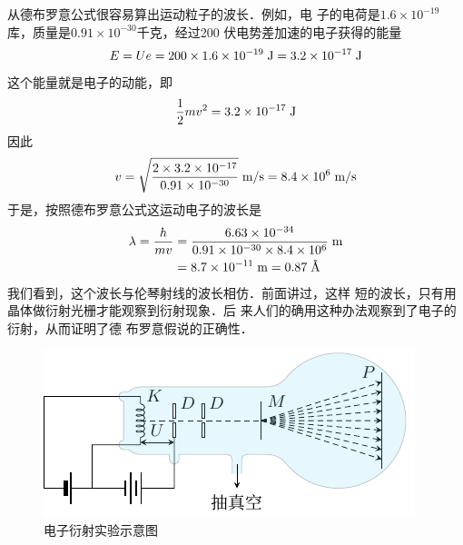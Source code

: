 从德布罗意公式很容易算出运动粒子的波长．例如，电
子的电荷是$1.6\times10^{-19}$
库，质量是$0.91\times10^{-30}$千克，经过200
伏电势差加速的电子获得的能量
\[E=Ue=200\times1.6\times10^{-19} \;\text{J} =3.2\times10^{-17} \;\text{J} \]
这个能量就是电子的动能，即
\[\dfrac{1}{2}mv^2=3.2\times10^{-17} \;\text{J} \]
因此
\[v=\sqrt{\frac{2\times 3.2\times10^{-17}}{0.91\times 10^{-30}}} \;\text{m}/\text{s} =8.4\times10^6\;\text{m}/\text{s} \]
于是，按照德布罗意公式这运动电子的波长是
\[\begin{split}
    \lambda=\dfrac{h}{mv}&=\frac{6.63\times 10^{-34}}{0.91\times10^{-30}\times8.4\times 10^6} \;\text{m}  \\
&=8.7\times10^{-11} \;\text{m} =0.87 \;\text{\AA}
\end{split}\]
我们看到，这个波长与伦琴射线的波长相仿．前面讲过，这样
短的波长，只有用晶体做衍射光栅才能观察到衍射现象．后
来人们的确用这种办法观察到了电子的衍射，从而证明了德
布罗意假说的正确性．
\begin{figure}[htbp]
    \centering
    \includegraphics{fig/C/7-5.pdf}
    \caption{电子衍射实验示意图}\label{fig_C_7-5}
\end{figure}

